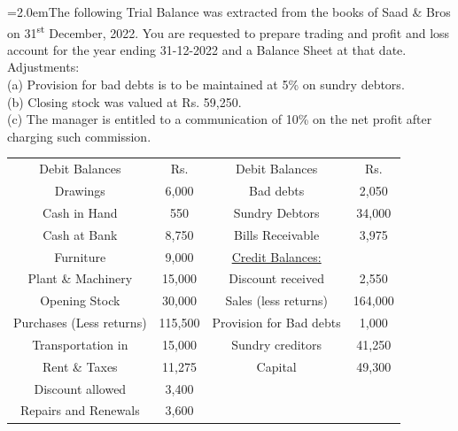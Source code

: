 \documentclass[11pt,a4paper]{article}
\newcommand{\lqn}[2]{\Needspace{6\baselineskip}\par\medskip\noindent\hangindent=2.0em\hangafter=1\makebox[2.0em][l]{\textbf{#1.}}#2\par}
\begin{document}
\lqn{107}{The following Trial Balance was extracted from the books of Saad \& Bros on 31\textsuperscript{st} December, 2022. You are requested to prepare trading and profit and loss account for the year ending 31-12-2022 and a Balance Sheet at that date.\\
Adjustments:\\
(a) Provision for bad debts is to be maintained at 5\% on sundry debtors.\\
(b) Closing stock was valued at Rs. 59,250.\\
(c) The manager is entitled to a communication of 10\% on the net profit after charging such commission.\par
\par\smallskip\noindent\hspace*{1.2em}\begin{tabular}{|cccc|}
\hline
Debit Balances & Rs. & Debit Balances & Rs. \\
Drawings & 6,000 & Bad debts & 2,050 \\
Cash in Hand & 550 & Sundry Debtors & 34,000 \\
Cash at Bank & 8,750 & Bills Receivable & 3,975 \\
Furniture & 9,000 & \underline{Credit Balances:} &  \\
Plant \& Machinery & 15,000 & Discount received & 2,550 \\
Opening Stock & 30,000 & Sales (less returns) & 164,000 \\
Purchases (Less returns) & 115,500 & Provision for Bad debts & 1,000 \\
Transportation in & 15,000 & Sundry creditors & 41,250 \\
Rent \& Taxes & 11,275 & Capital & 49,300 \\
Discount allowed & 3,400 &  &  \\
Repairs and Renewals & 3,600 &  &  \\
\hline
\end{tabular}\par\smallskip
}
\end{document}
